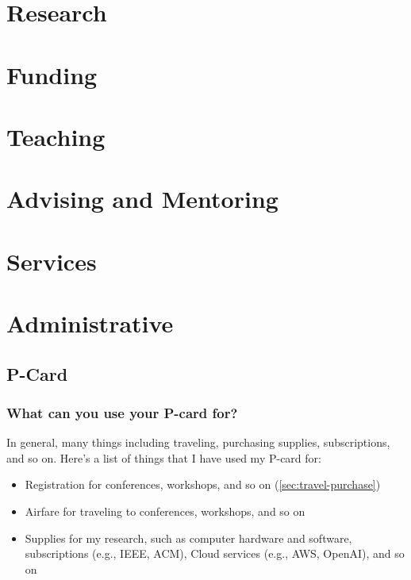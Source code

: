 \documentclass[oneside,11pt,dvipsnames]{book}
\begin{document}

\part{Research}

\part{Funding}

\part{Teaching} 

\part{Advising and Mentoring}

\part{Services}


\part{Administrative}

\chapter{P-Card}

\section{What can you use your P-card for?}

In general, many things including traveling, purchasing supplies, subscriptions, and so on. Here's a list of things that I have used my P-card for:

\begin{itemize}
  \item Registration for conferences, workshops, and so on (\autoref{sec:travel-purchase})
  \item Airfare for traveling to conferences, workshops, and so on
  \item Supplies for my research, such as computer hardware and software, subscriptions (e.g., IEEE, ACM), Cloud services (e.g., AWS, OpenAI), and so on
\end{itemize}
\end{document}
